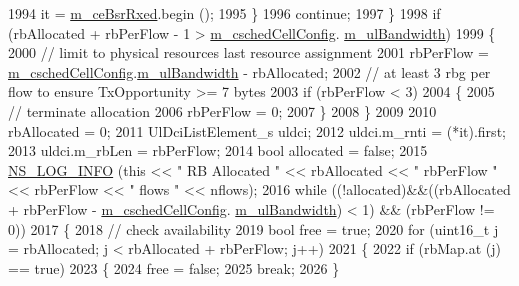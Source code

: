 \begin{DoxyCode}
1994               it = \hyperlink{classns3_1_1PssFfMacScheduler_a7adb86186e0190e6b0aa66a562499268}{m\_ceBsrRxed}.begin ();
1995             \}
1996           \textcolor{keywordflow}{continue};
1997         \}
1998       \textcolor{keywordflow}{if} (rbAllocated + rbPerFlow - 1 > \hyperlink{classns3_1_1PssFfMacScheduler_a6808e2b2024ed0ced82f80bfe6f0801f}{m\_cschedCellConfig}.
      \hyperlink{structns3_1_1FfMacCschedSapProvider_1_1CschedCellConfigReqParameters_a5ab5b102878e6e7e7727a14af4a64d2f}{m\_ulBandwidth})
1999         \{
2000           \textcolor{comment}{// limit to physical resources last resource assignment}
2001           rbPerFlow = \hyperlink{classns3_1_1PssFfMacScheduler_a6808e2b2024ed0ced82f80bfe6f0801f}{m\_cschedCellConfig}.\hyperlink{structns3_1_1FfMacCschedSapProvider_1_1CschedCellConfigReqParameters_a5ab5b102878e6e7e7727a14af4a64d2f}{m\_ulBandwidth} - rbAllocated;
2002           \textcolor{comment}{// at least 3 rbg per flow to ensure TxOpportunity >= 7 bytes}
2003           \textcolor{keywordflow}{if} (rbPerFlow < 3)
2004             \{
2005               \textcolor{comment}{// terminate allocation}
2006               rbPerFlow = 0;      
2007             \}
2008         \}
2009 
2010       rbAllocated = 0;
2011       UlDciListElement\_s uldci;
2012       uldci.m\_rnti = (*it).first;
2013       uldci.m\_rbLen = rbPerFlow;
2014       \textcolor{keywordtype}{bool} allocated = \textcolor{keyword}{false};
2015       \hyperlink{group__logging_gafbd73ee2cf9f26b319f49086d8e860fb}{NS\_LOG\_INFO} (\textcolor{keyword}{this} << \textcolor{stringliteral}{" RB Allocated "} << rbAllocated << \textcolor{stringliteral}{" rbPerFlow "} << rbPerFlow << \textcolor{stringliteral}{"
       flows "} << nflows);
2016       \textcolor{keywordflow}{while} ((!allocated)&&((rbAllocated + rbPerFlow - \hyperlink{classns3_1_1PssFfMacScheduler_a6808e2b2024ed0ced82f80bfe6f0801f}{m\_cschedCellConfig}.
      \hyperlink{structns3_1_1FfMacCschedSapProvider_1_1CschedCellConfigReqParameters_a5ab5b102878e6e7e7727a14af4a64d2f}{m\_ulBandwidth}) < 1) && (rbPerFlow != 0))
2017         \{
2018           \textcolor{comment}{// check availability}
2019           \textcolor{keywordtype}{bool} free = \textcolor{keyword}{true};
2020           \textcolor{keywordflow}{for} (uint16\_t j = rbAllocated; j < rbAllocated + rbPerFlow; j++)
2021             \{
2022               \textcolor{keywordflow}{if} (rbMap.at (j) == \textcolor{keyword}{true})
2023                 \{
2024                   free = \textcolor{keyword}{false};
2025                   \textcolor{keywordflow}{break};
2026                 \}

\end{DoxyCode}
